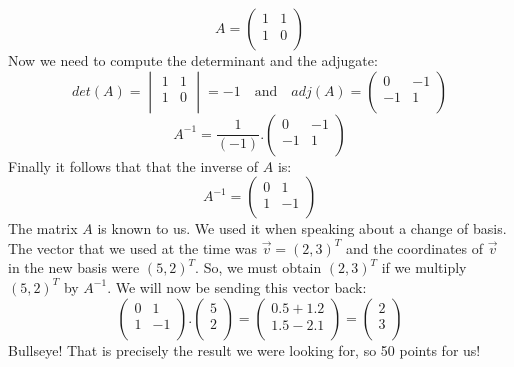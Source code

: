 \documentclass[600paper, 11pt,twoside,openany]{kdp}
\begin{document}
\[A = 
\begin{pmatrix}
1 & 1 \\
1 & 0 \\
\end{pmatrix}
\]
\indent Now we need to compute the determinant and the adjugate:
\[
det(A) = 
\begin{vmatrix}
1 & 1 \\
1 & 0 \\
\end{vmatrix} = -1
\quad \textrm{and} \quad  adj(A) = \begin{pmatrix}
0 & -1 \\
-1 & 1 \\
\end{pmatrix}
\]
\[
A^{-1} =  \frac{1}{(-1)}.\begin{pmatrix}
0 & -1 \\
-1 & 1 \\
\end{pmatrix}
\]
\indent Finally it follows that that the inverse of $A$ is:
\[A^{-1} = \begin{pmatrix}
0 & 1 \\
1 & -1 \\
\end{pmatrix}\]
\indent The matrix $A$ is known to us. We used it when speaking about a change of basis. The vector that we used at the time was  $\overrightarrow{v} = (2,3)^T$ and the coordinates of $\overrightarrow{v}$ in the new basis were  $(5,2)^T$. So, we must obtain $(2,3)^T$ if we multiply $(5,2)^T$ by $A^{-1}$. We will now be sending this vector back:
\[
 \begin{pmatrix}
0 & 1 \\
1 & -1 \\
\end{pmatrix}.\begin{pmatrix}
5\\
2\\
\end{pmatrix} = \begin{pmatrix}
0.5 + 1.2 \\
1.5 - 2.1 \\
\end{pmatrix} = \begin{pmatrix}
2\\
3\\
\end{pmatrix}
\]
\indent Bullseye! That is precisely the result we were looking for, so 50 points for us!
\par 
\vspace{-3pt}
\end{document}
